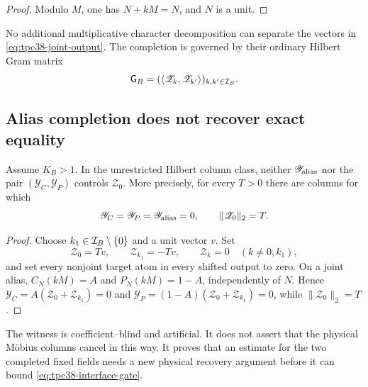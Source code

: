\begin{proof}
Modulo \(M\), one has \(N+kM=N\), and \(N\) is a unit.
\end{proof}

No additional multiplicative character decomposition can separate the
vectors in \eqref{eq:tpc38-joint-output}.  The completion is governed by
their ordinary Hilbert Gram matrix
\begin{equation}
 \mathsf G_B=(\langle\mathscr Z_k,\mathscr Z_{k'}\rangle)_{k,k'\in\mathcal I_B}.
 \label{eq:tpc38-alias-Gram-matrix}
\end{equation}

\subsection{Alias completion does not recover exact equality}

\begin{theorem}
\label{thm:tpc38-equality-recovery-obstruction}
Assume \(K_B>1\).  In the unrestricted Hilbert column class, neither
\(\mathscr Y_{\rm alias}\) nor the pair
\((\mathscr Y_C,\mathscr Y_P)\) controls \(\mathscr Z_0\).  More precisely,
for every \(T>0\) there are columns for which
\begin{equation}
 \mathscr Y_C=\mathscr Y_P=\mathscr Y_{\rm alias}=0,
 \qquad
 \|\mathscr Z_0\|_2=T.
 \label{eq:tpc38-equality-recovery-witness-output}
\end{equation}
\end{theorem}

\begin{proof}
Choose \(k_1\in\mathcal I_B\setminus\{0\}\) and a unit vector \(v\).  Set
\begin{equation}
 \mathscr Z_0=Tv,
 \qquad
 \mathscr Z_{k_1}=-Tv,
 \qquad
 \mathscr Z_k=0\quad(k\ne0,k_1),
 \label{eq:tpc38-equality-recovery-witness}
\end{equation}
and set every nonjoint target atom in every shifted output to zero.  On a joint alias,
\(C_N(kM)=A\) and \(P_N(kM)=1-A\), independently of \(N\).  Hence
\(\mathscr Y_C=A(\mathscr Z_0+\mathscr Z_{k_1})=0\) and
\(\mathscr Y_P=(1-A)(\mathscr Z_0+\mathscr Z_{k_1})=0\), while
\(\|\mathscr Z_0\|_2=T\).
\end{proof}

The witness is coefficient--blind and artificial.  It does not assert
that the physical M\"obius columns cancel in this way.  It proves that an
estimate for the two completed fixed fields needs a new physical recovery
argument before it can bound \eqref{eq:tpc38-interface-gate}.

